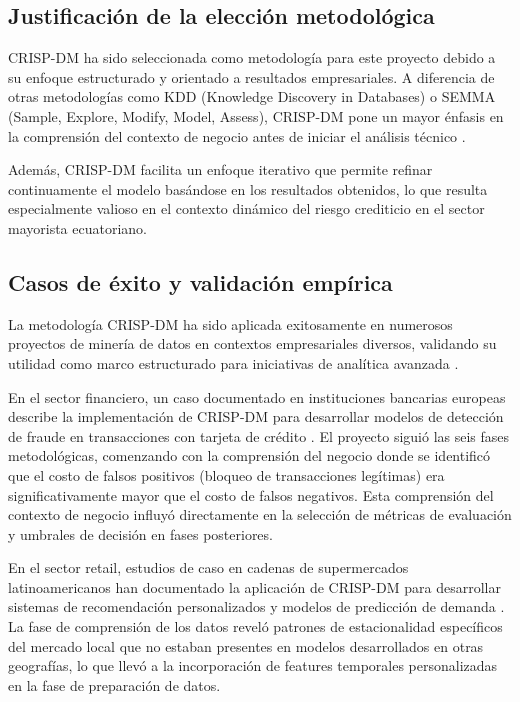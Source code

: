 \subsection{Justificación de la elección metodológica}
CRISP-DM ha sido seleccionada como metodología para este proyecto debido a su enfoque estructurado y orientado a resultados empresariales. A diferencia de otras metodologías como KDD (Knowledge Discovery in Databases) o SEMMA (Sample, Explore, Modify, Model, Assess), CRISP-DM pone un mayor énfasis en la comprensión del contexto de negocio antes de iniciar el análisis técnico \cite{hernandez2020metodologia}.

Además, CRISP-DM facilita un enfoque iterativo que permite refinar continuamente el modelo basándose en los resultados obtenidos, lo que resulta especialmente valioso en el contexto dinámico del riesgo crediticio en el sector mayorista ecuatoriano.

\subsection{Casos de éxito y validación empírica}
La metodología CRISP-DM ha sido aplicada exitosamente en numerosos proyectos de minería de datos en contextos empresariales diversos, validando su utilidad como marco estructurado para iniciativas de analítica avanzada \cite{martinez2019crisp}.

En el sector financiero, un caso documentado en instituciones bancarias europeas describe la implementación de CRISP-DM para desarrollar modelos de detección de fraude en transacciones con tarjeta de crédito \cite{wirth2000crisp}. El proyecto siguió las seis fases metodológicas, comenzando con la comprensión del negocio donde se identificó que el costo de falsos positivos (bloqueo de transacciones legítimas) era significativamente mayor que el costo de falsos negativos. Esta comprensión del contexto de negocio influyó directamente en la selección de métricas de evaluación y umbrales de decisión en fases posteriores.

En el sector retail, estudios de caso en cadenas de supermercados latinoamericanos han documentado la aplicación de CRISP-DM para desarrollar sistemas de recomendación personalizados y modelos de predicción de demanda \cite{chapman2000crisp}. La fase de comprensión de los datos reveló patrones de estacionalidad específicos del mercado local que no estaban presentes en modelos desarrollados en otras geografías, lo que llevó a la incorporación de features temporales personalizadas en la fase de preparación de datos.

